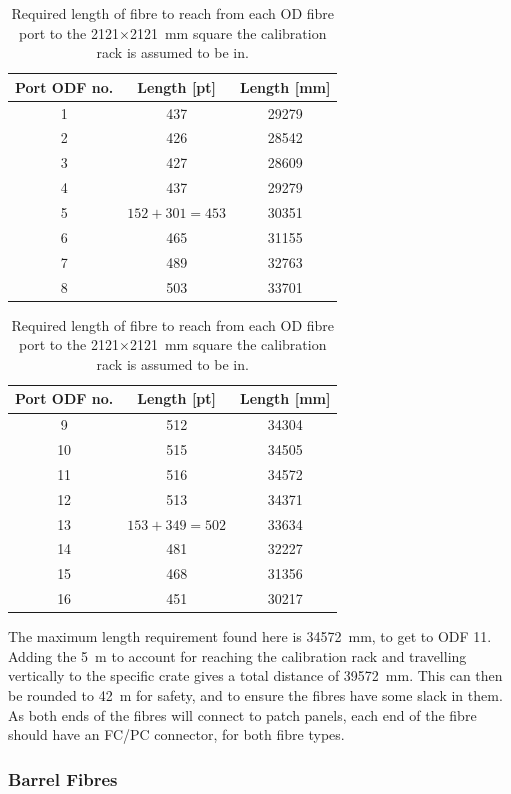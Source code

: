 \documentclass[a4paper,11pt]{article}
\begin{document}
\begin{center}
\begin{table}[h]
\begin{tabular}{ccc} \toprule
Port ODF no. &	Length [pt]	&	Length [mm] \\ \midrule
	1			&	437			&	29279		\\
	2			&	426			&	28542		\\
	3			&	427			&	28609		\\
	4			&	437			&	29279		\\
	5			&$152+301=453$	&	30351		\\
	6			&	465			&	31155		\\
	7			&	489			&	32763		\\
	8			&	503			&	33701		\\
	\bottomrule
\end{tabular}
\begin{tabular}{ccc} \toprule
Port ODF no. &	Length [pt]	&	Length [mm] \\ \midrule
	9			&	512			&	34304		\\
	10			&	515			&	34505		\\
	11			&	516			&	34572		\\
	12			&	513			&	34371		\\
	13			&$153+349=502$	&	33634		\\
	14			&	481			&	32227		\\
	15			&	468			&	31356		\\
	16			&	451			&	30217		\\
	\bottomrule
\end{tabular}
\caption{Required length of fibre to reach from each OD fibre port to the 2121$\times$2121~mm square the calibration rack is assumed to be in.}\label{tab:deckFibreLen}
\end{table}
\end{center}
The maximum length requirement found here is 34572~mm, to get to ODF 11. Adding the 5~m to account for reaching the calibration rack and travelling vertically to the specific crate gives a total distance of 39572~mm. This can then be rounded to 42~m for safety, and to ensure the fibres have some slack in them. As both ends of the fibres will connect to patch panels, each end of the fibre should have an FC/PC connector, for both fibre types.

\subsubsection{Barrel Fibres}\label{sec:lengths:sub:len:sub:barrel}
\end{document}
